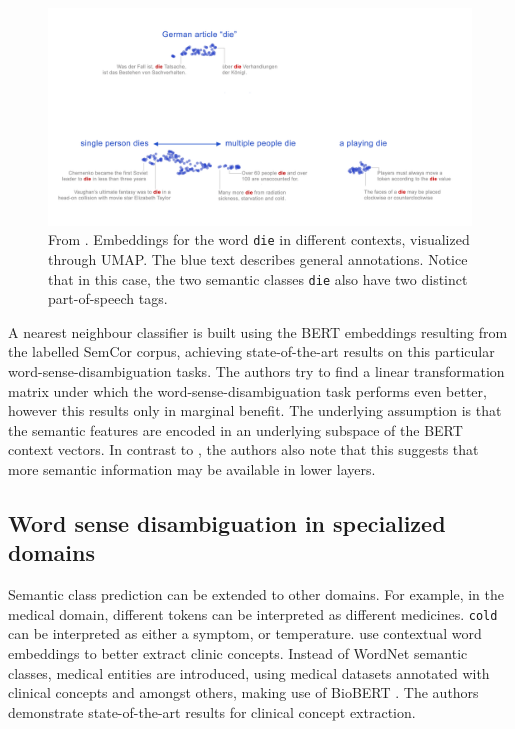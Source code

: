 \documentclass[a4paper,12pt,oneside,openright]{report}
\begin{document}
\begin{figure}[H]
	\center
  \includegraphics[width=0.9\linewidth]{./assets/relatedwork/BERT_plurality.png}
  \caption{From \cite{coenen19}. Embeddings for the word \texttt{die} in different contexts, visualized through UMAP. The blue text describes general annotations.
  Notice that in this case, the two semantic classes \texttt{die} also have two distinct part-of-speech tags.
  }
  \label{fig:BERT_plurality}
\end{figure}

A nearest neighbour classifier is built using the BERT embeddings resulting from the labelled SemCor corpus, achieving state-of-the-art results on this particular word-sense-disambiguation tasks.
The authors try to find a linear transformation matrix under which the word-sense-disambiguation task performs even better, however this results only in marginal benefit.
The underlying assumption is that the semantic features are encoded in an underlying subspace of the BERT context vectors.
In contrast to \cite{jawahar19}, \cite{coenen19} the authors also note that this suggests that more semantic information may be available in lower layers. \\

\subsection{Word sense disambiguation in specialized domains}

Semantic class prediction can be extended to other domains. 
For example, in the medical domain, different tokens can be interpreted as different medicines. 
\texttt{cold} can be interpreted as either a symptom, or temperature.
\cite{si19} use contextual word embeddings to better extract clinic concepts. 
Instead of WordNet semantic classes, medical entities are introduced, using medical datasets annotated with clinical concepts and amongst others, making use of BioBERT \cite{lee19}.
The authors demonstrate state-of-the-art results for clinical concept extraction. \\
\end{document}

